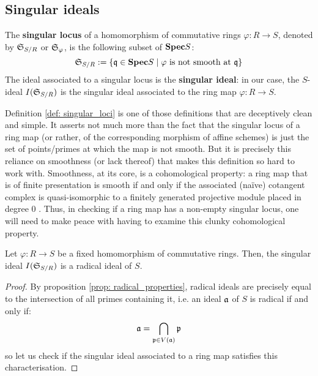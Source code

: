         \subsection{Singular ideals}
            \begin{definition} \label{def: singular_loci}
                The \textbf{singular locus} of a homomorphism of commutative rings $\varphi: R \to S$, denoted by $\mathfrak{S}_{S/R}$ or $\mathfrak{S}_{\varphi}$, is the following subset of $\mathbf{Spec} S$:
                    $$\mathfrak{S}_{S/R} := \{\mathfrak{q} \in \mathbf{Spec} S \mid \text{$\varphi$ is not smooth at $\mathfrak{q}$}\}$$
                The ideal associated to a singular locus is the \textbf{singular ideal}: in our case, the $S$-ideal $I(\mathfrak{S}_{S/R})$ is the singular ideal associated to the ring map $\varphi: R \to S$.
            \end{definition}
            \begin{remark}
                Definition \ref{def: singular_loci} is one of those definitions that are deceptively clean and simple. It asserts not much more than the fact that the singular locus of a ring map (or rather, of the corresponding morphism of affine schemes) is just the set of points/primes at which the map is not smooth. But it is precisely this reliance on smoothness (or lack thereof) that makes this definition so hard to work with. Smoothness, at its core, is a cohomological property: a ring map that is of finite presentation is smooth if and only if the associated (na\"ive) cotangent complex is quasi-isomorphic to a finitely generated projective module placed in degree $0$ \cite[\href{https://stacks.math.columbia.edu/tag/00T2}{Tag 00T2}]{stacks}. Thus, in checking if a ring map has a non-empty singular locus, one will need to make peace with having to examine this clunky cohomological property.  
            \end{remark}
            
            \begin{proposition}
                Let $\varphi: R \to S$ be a fixed homomorphism of commutative rings. Then, the singular ideal $I(\mathfrak{S}_{S/R})$ is a radical ideal of $S$.
            \end{proposition}
                \begin{proof}
                    By proposition \ref{prop: radical_properties}, radical ideals are precisely equal to the intersection of all primes containing it, i.e. an ideal $\mathfrak{a}$ of $S$ is radical if and only if:
                        $$\mathfrak{a} = \bigcap_{\mathfrak{p} \in V(\mathfrak{a})} \mathfrak{p}$$
                    so let us check if the singular ideal associated to a ring map satisfies this characterisation. 
                \end{proof}
    
